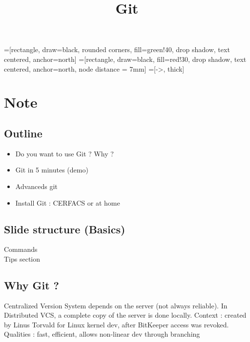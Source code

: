\documentclass{article}
\begin{document}
=[rectangle, draw=black, rounded corners, fill=green!40, drop
shadow, text centered, anchor=north]
=[rectangle, draw=black, fill=red!30, drop
shadow, text centered, anchor=north, node distance = 7mm]
=[->, thick]

\title{Git}
\maketitle

\section{Note}
\subsection{Outline}
\begin{itemize}
\item Do you want to use Git ? Why ?
\item Git in 5 minutes (demo)
\item Advanceds git
\item Install Git : CERFACS or at home
\end{itemize}

\subsection{Slide structure (Basics)}
Commands \\
Tips section

\subsection{Why Git ?}
Centralized Version System depends on the server (not always reliable).
In Distributed VCS, a complete copy of the server is done locally.
Context : created by Linus Torvald for Linux kernel dev, after BitKeeper access
was revoked.
Qualities : fast, efficient, allows non-linear dev through branching
\end{document}
